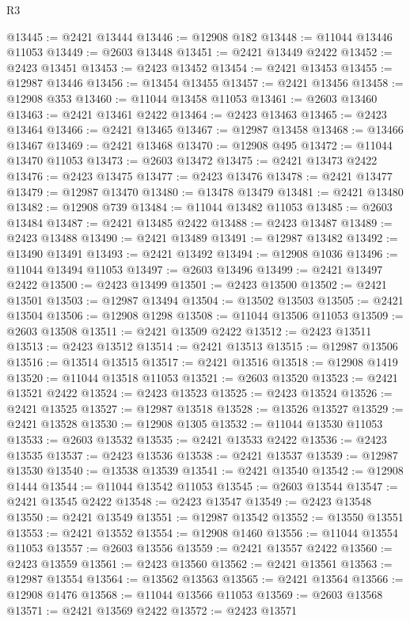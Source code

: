 \begin{lexlean}{R3}
\begin{coremodule}
@13445 := @2421 @13444
@13446 := @12908 @182
@13448 := @11044 @13446 @11053
@13449 := @2603 @13448
@13451 := @2421 @13449 @2422
@13452 := @2423 @13451
@13453 := @2423 @13452
@13454 := @2421 @13453
@13455 := @12987 @13446
@13456 := @13454 @13455
@13457 := @2421 @13456
@13458 := @12908 @353
@13460 := @11044 @13458 @11053
@13461 := @2603 @13460
@13463 := @2421 @13461 @2422
@13464 := @2423 @13463
@13465 := @2423 @13464
@13466 := @2421 @13465
@13467 := @12987 @13458
@13468 := @13466 @13467
@13469 := @2421 @13468
@13470 := @12908 @495
@13472 := @11044 @13470 @11053
@13473 := @2603 @13472
@13475 := @2421 @13473 @2422
@13476 := @2423 @13475
@13477 := @2423 @13476
@13478 := @2421 @13477
@13479 := @12987 @13470
@13480 := @13478 @13479
@13481 := @2421 @13480
@13482 := @12908 @739
@13484 := @11044 @13482 @11053
@13485 := @2603 @13484
@13487 := @2421 @13485 @2422
@13488 := @2423 @13487
@13489 := @2423 @13488
@13490 := @2421 @13489
@13491 := @12987 @13482
@13492 := @13490 @13491
@13493 := @2421 @13492
@13494 := @12908 @1036
@13496 := @11044 @13494 @11053
@13497 := @2603 @13496
@13499 := @2421 @13497 @2422
@13500 := @2423 @13499
@13501 := @2423 @13500
@13502 := @2421 @13501
@13503 := @12987 @13494
@13504 := @13502 @13503
@13505 := @2421 @13504
@13506 := @12908 @1298
@13508 := @11044 @13506 @11053
@13509 := @2603 @13508
@13511 := @2421 @13509 @2422
@13512 := @2423 @13511
@13513 := @2423 @13512
@13514 := @2421 @13513
@13515 := @12987 @13506
@13516 := @13514 @13515
@13517 := @2421 @13516
@13518 := @12908 @1419
@13520 := @11044 @13518 @11053
@13521 := @2603 @13520
@13523 := @2421 @13521 @2422
@13524 := @2423 @13523
@13525 := @2423 @13524
@13526 := @2421 @13525
@13527 := @12987 @13518
@13528 := @13526 @13527
@13529 := @2421 @13528
@13530 := @12908 @1305
@13532 := @11044 @13530 @11053
@13533 := @2603 @13532
@13535 := @2421 @13533 @2422
@13536 := @2423 @13535
@13537 := @2423 @13536
@13538 := @2421 @13537
@13539 := @12987 @13530
@13540 := @13538 @13539
@13541 := @2421 @13540
@13542 := @12908 @1444
@13544 := @11044 @13542 @11053
@13545 := @2603 @13544
@13547 := @2421 @13545 @2422
@13548 := @2423 @13547
@13549 := @2423 @13548
@13550 := @2421 @13549
@13551 := @12987 @13542
@13552 := @13550 @13551
@13553 := @2421 @13552
@13554 := @12908 @1460
@13556 := @11044 @13554 @11053
@13557 := @2603 @13556
@13559 := @2421 @13557 @2422
@13560 := @2423 @13559
@13561 := @2423 @13560
@13562 := @2421 @13561
@13563 := @12987 @13554
@13564 := @13562 @13563
@13565 := @2421 @13564
@13566 := @12908 @1476
@13568 := @11044 @13566 @11053
@13569 := @2603 @13568
@13571 := @2421 @13569 @2422
@13572 := @2423 @13571

\end{coremodule}
\end{lexlean}
